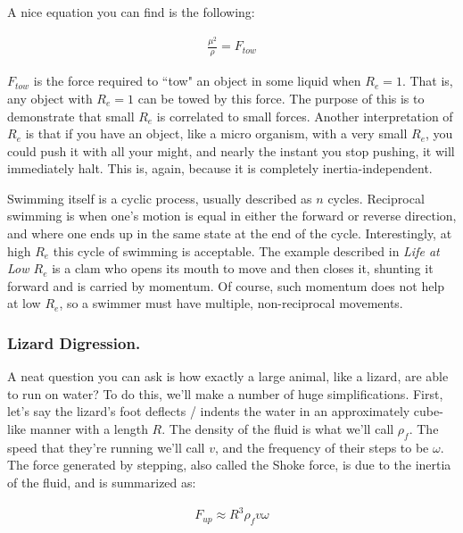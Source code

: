 \documentclass[12pt]{report}
\begin{document}
A nice equation you can find is the following: 

\begin{equation} \label{tow}
\begin{split}
\frac{\mu^2}{\rho} = F_{tow}
\end{split}
\end{equation}

$F_{tow}$ is the force required to ``tow" an object in some liquid when $R_e = 1$. That is, any object with $R_e = 1$ can be towed by this force. The purpose of this is to demonstrate that small $R_e$ is correlated to small forces. Another interpretation of $R_e$ is that if you have an object, like a micro organism, with a very small $R_e$, you could push it with all your might, and nearly the instant you stop pushing, it will immediately halt. This is, again, because it is completely inertia-independent.\newline

Swimming itself is a cyclic process, usually described as $n$ cycles. Reciprocal swimming is when one's motion is equal in either the forward or reverse direction, and where one ends up in the same state at the end of the cycle. Interestingly, at high $R_e$ this cycle of swimming is acceptable. The example described in \textit{Life at Low $R_e$} is a clam who opens its mouth to move and then closes it, shunting it forward and is carried by momentum. Of course, such momentum does not help at low $R_e$, so a swimmer must have multiple, non-reciprocal movements. 

\subsubsection{Lizard Digression.}

A neat question you can ask is how exactly a large animal, like a lizard, are able to run on water? To do this, we'll make a number of huge simplifications. First, let's say the lizard's foot deflects / indents the water in an approximately cube-like manner with a length $R$. The density of the fluid is what we'll call $\rho_f$. The speed that they're running we'll call $v$, and the frequency of their steps to be $\omega$. The force generated by stepping, also called the Shoke force, is due to the inertia of the fluid, and is summarized as: 

\begin{equation} \label{lizard1}
\begin{split}
F_{up} \approx R^3\rho_f v\omega
\end{split}
\end{equation}
\end{document}
